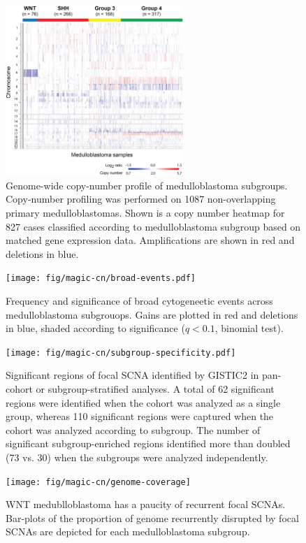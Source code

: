 \documentclass[11pt,letterpaper]{article}
\theoremstyle{definition}
\begin{document}
\begin{figure}
	\centering
	\includegraphics[width=0.6\textwidth]{fig/magic-cn/cn-heatmap.png}
	\caption{Genome-wide copy-number profile of medulloblastoma subgroups.
	Copy-number profiling was performed on 1087 non-overlapping primary medulloblastomas. Shown is a copy number heatmap for 827 cases classified according to medulloblastoma subgroup based on matched gene expression data.  Amplifications are shown in red and deletions in blue.}
	\label{fig:cn-heatmap}
\end{figure}

\begin{figure}
	\centering
	\texttt{[image: fig/magic-cn/broad-events.pdf]}
	\caption{Frequency and significance of broad cytogeneetic events across medulloblastoma subgrouops.
	Gains are plotted in red and deletions in blue, shaded according to significance ($q < 0.1$, binomial test).}
	\label{fig:broad-events}
\end{figure} 


\clearpage

\begin{figure}
	\centering
	\texttt{[image: fig/magic-cn/subgroup-specificity.pdf]}
	\caption{Significant regions of focal SCNA identified by GISTIC2 in pan-cohort or subgroup-stratified analyses.
	A total of 62 significant regions were identified when the cohort was analyzed as a single group, whereas 110 significant regions were captured when the cohort was analyzed according to subgroup. The number of significant subgroup-enriched regions identified more than doubled (73 vs. 30) when the subgroups were analyzed independently.}
	\label{fig:subgroup-specificity}
\end{figure}

\begin{figure}
	\centering
	\texttt{[image: fig/magic-cn/genome-coverage]}
	\caption{WNT medublloblastoma has a paucity of recurrent focal SCNAs. Bar-plots of the proportion of genome recurrently disrupted by focal SCNAs are depicted for each medulloblastoma subgroup.}
	\label{fig:genome-coverage}
\end{figure}
\end{document}

